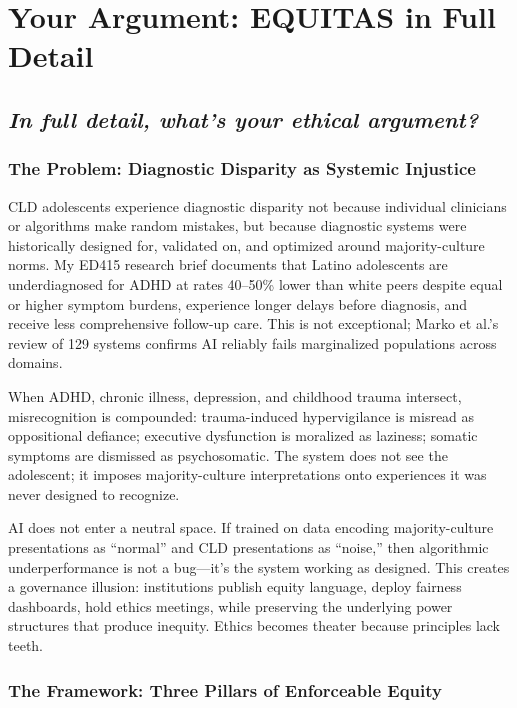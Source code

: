 \documentclass[12pt,a4paper]{article}
\begin{document}
\section{Your Argument: EQUITAS in Full Detail}

\subsection*{\textit{In full detail, what's your ethical argument?}}

\subsubsection{The Problem: Diagnostic Disparity as Systemic Injustice}

CLD adolescents experience diagnostic disparity not because individual clinicians or algorithms make random mistakes, but because diagnostic systems were historically designed for, validated on, and optimized around majority-culture norms. My ED415 research brief documents that Latino adolescents are underdiagnosed for ADHD at rates 40--50\% lower than white peers despite equal or higher symptom burdens, experience longer delays before diagnosis, and receive less comprehensive follow-up care.\cite{garcia_ed415} This is not exceptional; Marko et al.'s review of 129 systems confirms AI reliably fails marginalized populations across domains.\cite{marko2025}

When ADHD, chronic illness, depression, and childhood trauma intersect, misrecognition is compounded: trauma-induced hypervigilance is misread as oppositional defiance; executive dysfunction is moralized as laziness; somatic symptoms are dismissed as psychosomatic. The system does not see the adolescent; it imposes majority-culture interpretations onto experiences it was never designed to recognize.

AI does not enter a neutral space. If trained on data encoding majority-culture presentations as ``normal'' and CLD presentations as ``noise,'' then algorithmic underperformance is not a bug—it's the system working as designed. This creates a governance illusion: institutions publish equity language, deploy fairness dashboards, hold ethics meetings, while preserving the underlying power structures that produce inequity. Ethics becomes theater because principles lack teeth.

\subsubsection{The Framework: Three Pillars of Enforceable Equity}
\end{document}
